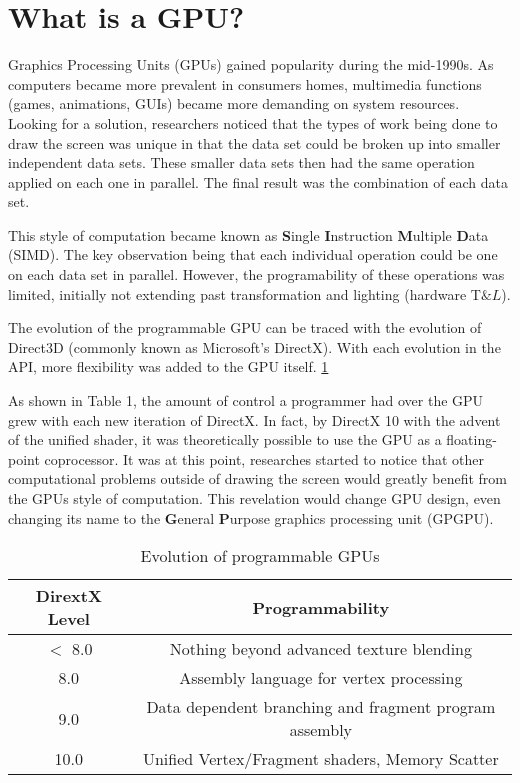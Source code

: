 \section*{What is a GPU?}

Graphics Processing Units (GPUs) gained popularity during the mid-1990s. As computers became more prevalent in consumers homes, multimedia functions (games, animations, GUIs) became more demanding on system resources. Looking for a solution, researchers noticed that the types of work being done to draw the screen was unique in that the data set could be broken up into smaller independent data sets. These smaller data sets then had the same operation applied on each one in parallel. The final result was the combination of each data set. 

This style of computation became known as \textbf{S}ingle \textbf{I}nstruction \textbf{M}ultiple \textbf{D}ata (SIMD). The key observation being that each individual operation could be one on each data set in parallel. However, the programability of these operations was limited, initially not extending past transformation and lighting (hardware T$\&L$). 

The evolution of the programmable GPU can be traced with the evolution of Direct3D (commonly known as Microsoft's DirectX). With each evolution in the API, more flexibility was added to the GPU itself. \ref{tab:gpuevolution}

As shown in Table 1, the amount of control a programmer had over the GPU grew with each new iteration of DirectX. In fact, by DirectX 10 with the advent of the unified shader, it was theoretically possible to use the GPU as a floating-point coprocessor. It was at this point, researches started to notice that other computational problems outside of drawing the screen would greatly benefit from the GPUs style of computation. This revelation would change GPU design, even changing its name to the \textbf{G}eneral \textbf{P}urpose graphics processing unit (GPGPU). 

\begin{table}
	\begin{tabular}{|c|c|}
		\hline
		\textbf{DirextX Level} & \textbf{Programmability} \\
		\hline
		$<$ 8.0 & Nothing beyond advanced texture blending \\
		8.0 & Assembly language for vertex processing \\
		9.0 & Data dependent branching and fragment program assembly\\
		10.0 & Unified Vertex/Fragment shaders, Memory Scatter \\
		\hline
	\end{tabular}
	\caption{Evolution of programmable GPUs}
	\label{tab:gpuevolution}
\end{table}


